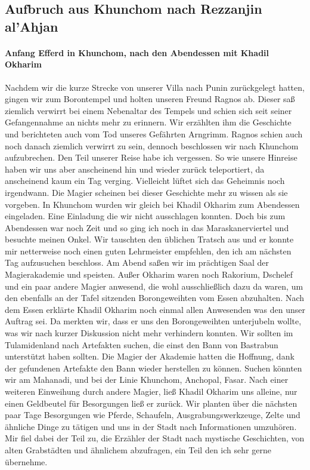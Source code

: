 \subsection{Aufbruch aus Khunchom nach Rezzanjin al'Ahjan}

\paragraph{Anfang Efferd in Khunchom, nach den Abendessen mit Khadil Okharim}
Nachdem wir die kurze Strecke von unserer Villa nach Punin zurückgelegt hatten, gingen wir zum Borontempel und holten unseren Freund Ragnos ab. Dieser saß ziemlich verwirrt bei einem Nebenaltar des Tempels und schien sich seit seiner Gefangennahme an nichts mehr zu erinnern. Wir erzählten ihm die Geschichte und berichteten auch vom Tod unseres Gefährten Arngrimm. Ragnos schien auch noch danach ziemlich verwirrt zu sein, dennoch beschlossen wir nach Khunchom aufzubrechen. Den Teil unserer Reise habe ich vergessen. So wie unsere Hinreise haben wir uns aber anscheinend hin und wieder zurück teleportiert, da anscheinend kaum ein Tag verging. Vielleicht lüftet sich das Geheimnis noch irgendwann. Die Magier scheinen bei dieser Geschichte mehr zu wissen als sie vorgeben.
In Khunchom wurden wir gleich bei Khadil Okharim zum Abendessen eingeladen. Eine Einladung die wir nicht ausschlagen konnten. Doch bis zum Abendessen war noch Zeit und so ging ich noch in das Maraskanerviertel und besuchte meinen Onkel. Wir tauschten den üblichen Tratsch aus und er konnte mir netterweise noch einen guten Lehrmeister empfehlen, den ich am nächsten Tag aufzusuchen beschloss. Am Abend saßen wir im prächtigen Saal der Magierakademie und speisten. Außer Okharim waren noch Rakorium, Dschelef und ein paar andere Magier anwesend, die wohl ausschließlich dazu da waren, um den ebenfalls an der Tafel sitzenden Borongeweihten vom Essen abzuhalten. Nach dem Essen erklärte Khadil Okharim noch einmal allen Anwesenden was den unser Auftrag sei. Da merkten wir, dass er uns den Borongeweihten unterjubeln wollte, was wir nach kurzer Diskussion nicht mehr verhindern konnten. Wir sollten im Tulamidenland nach Artefakten suchen, die einst den Bann von Bastrabun unterstützt haben sollten. Die Magier der Akademie hatten die Hoffnung, dank der gefundenen Artefakte den Bann wieder herstellen zu können. Suchen könnten wir am Mahanadi, und bei der Linie Khunchom, Anchopal, Fasar. Nach einer weiteren Einweihung durch andere Magier, ließ Khadil Okharim uns alleine, nur einen Geldbeutel für Besorgungen ließ er zurück. Wir planten über die nächsten paar Tage Besorgungen wie Pferde, Schaufeln, Ausgrabungswerkzeuge, Zelte und ähnliche Dinge zu tätigen und uns in der Stadt nach Informationen umzuhören. Mir fiel dabei der Teil zu, die Erzähler der Stadt nach mystische Geschichten, von alten Grabstädten und ähnlichem abzufragen, ein Teil den ich sehr gerne übernehme.

